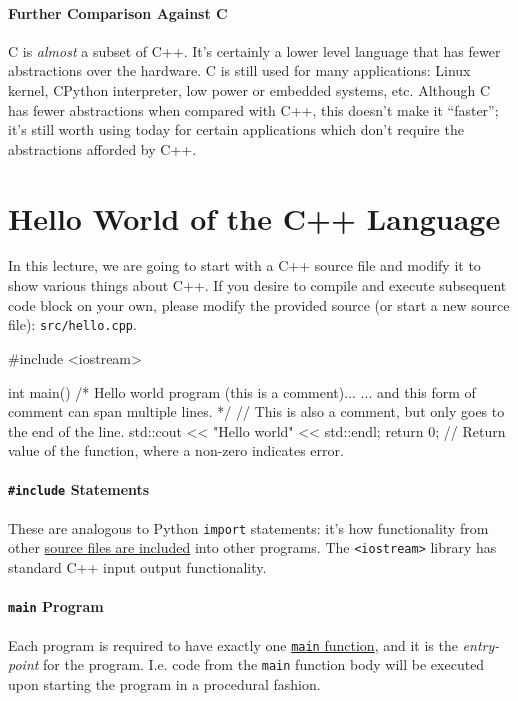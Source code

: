 \documentclass[12pt,letterpaper,twoside]{article}
\begin{document}
  \paragraph{Further Comparison Against C}
  C is \emph{almost} a subset of C++. It's certainly
  a lower level language that has fewer abstractions over the
  hardware. C is still used for many applications: Linux kernel, CPython
  interpreter, low power or embedded systems, etc.
  Although C has fewer abstractions when compared with C++, this
  doesn't make it ``faster''; it's still worth using today for certain
  applications which don't require the abstractions afforded by C++.

\section{Hello World of the C++ Language}
In this lecture, we are going to start with a C++ source file and modify
it to show various things about C++. If you desire to compile and
execute subsequent code block on your own, please modify the provided
source (or start a new source file): \texttt{src/hello.cpp}.

\begin{cpp}
#include <iostream>

int main() {
  /* Hello world program (this is a comment)...
     ... and this form of comment can span multiple lines. */
  // This is also a comment, but only goes to the end of the line.
  std::cout << "Hello world" << std::endl;
  return 0; // Return value of the function, where a non-zero indicates error.
}
\end{cpp}

\paragraph{\texttt{\#include} Statements}
These are analogous to Python \texttt{import}
  statements: it's how functionality from other
  \href{https://en.cppreference.com/w/cpp/preprocessor/include}{source
    files are included} into other programs.
  The \texttt{\textless{}iostream\textgreater{}} library has standard C++ input
  output functionality.

\paragraph{\texttt{main} Program}
Each program is required to have exactly one
\href{https://en.cppreference.com/w/cpp/language/main_function}
{\texttt{main} function}, and it is the \emph{entry-point} for the program.
I.e. code from the \texttt{main} function body will be executed upon starting
the program in a procedural fashion.
\end{document}
